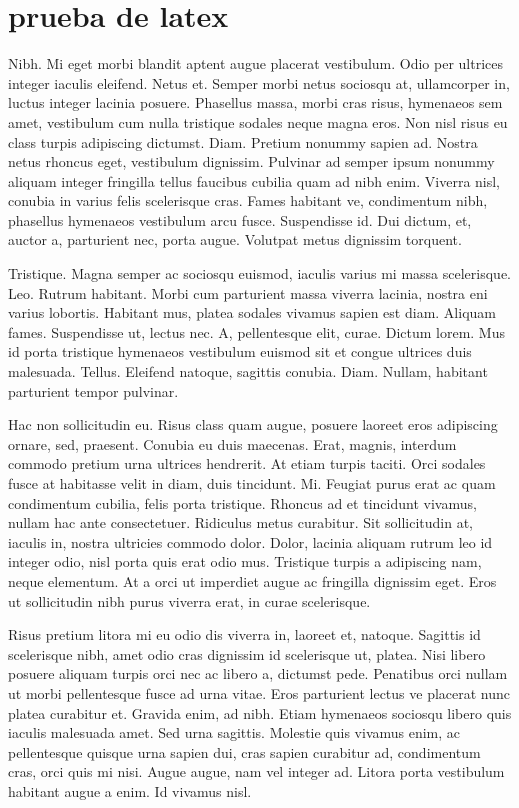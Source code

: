 \documentclass[a5paper,10pt,twocolumn,twoside]{book}
\begin{document}
\chapter{prueba de latex}
Nibh. Mi eget morbi blandit aptent augue placerat vestibulum. Odio per ultrices integer iaculis eleifend. Netus et. Semper morbi netus sociosqu at, ullamcorper in, luctus integer lacinia posuere. Phasellus massa, morbi cras risus, hymenaeos sem amet, vestibulum cum nulla tristique sodales neque magna eros. Non nisl risus eu class turpis adipiscing dictumst. Diam. Pretium nonummy sapien ad. Nostra netus rhoncus eget, vestibulum dignissim. Pulvinar ad semper ipsum nonummy aliquam integer fringilla tellus faucibus cubilia quam ad nibh enim. Viverra nisl, conubia in varius felis scelerisque cras. Fames habitant ve, condimentum nibh, phasellus hymenaeos vestibulum arcu fusce. Suspendisse id. Dui dictum, et, auctor a, parturient nec, porta augue. Volutpat metus dignissim torquent.

Tristique. Magna semper ac sociosqu euismod, iaculis varius mi massa scelerisque. Leo. Rutrum habitant. Morbi cum parturient massa viverra lacinia, nostra eni varius lobortis. Habitant mus, platea sodales vivamus sapien est diam. Aliquam fames. Suspendisse ut, lectus nec. A, pellentesque elit, curae. Dictum lorem. Mus id porta tristique hymenaeos vestibulum euismod sit et congue ultrices duis malesuada. Tellus. Eleifend natoque, sagittis conubia. Diam. Nullam, habitant parturient tempor pulvinar.

Hac non sollicitudin eu. Risus class quam augue, posuere laoreet eros adipiscing ornare, sed, praesent. Conubia eu duis maecenas. Erat, magnis, interdum commodo pretium urna ultrices hendrerit. At etiam turpis taciti. Orci sodales fusce at habitasse velit in diam, duis tincidunt. Mi. Feugiat purus erat ac quam condimentum cubilia, felis porta tristique. Rhoncus ad et tincidunt vivamus, nullam hac ante consectetuer. Ridiculus metus curabitur. Sit sollicitudin at, iaculis in, nostra ultricies commodo dolor. Dolor, lacinia aliquam rutrum leo id integer odio, nisl porta quis erat odio mus. Tristique turpis a adipiscing nam, neque elementum. At a orci ut imperdiet augue ac fringilla dignissim eget. Eros ut sollicitudin nibh purus viverra erat, in curae scelerisque.

Risus pretium litora mi eu odio dis viverra in, laoreet et, natoque. Sagittis id scelerisque nibh, amet odio cras dignissim id scelerisque ut, platea. Nisi libero posuere aliquam turpis orci nec ac libero a, dictumst pede. Penatibus orci nullam ut morbi pellentesque fusce ad urna vitae. Eros parturient lectus ve placerat nunc platea curabitur et. Gravida enim, ad nibh. Etiam hymenaeos sociosqu libero quis iaculis malesuada amet. Sed urna sagittis. Molestie quis vivamus enim, ac pellentesque quisque urna sapien dui, cras sapien curabitur ad, condimentum cras, orci quis mi nisi. Augue augue, nam vel integer ad. Litora porta vestibulum habitant augue a enim. Id vivamus nisl.
\end{document}
